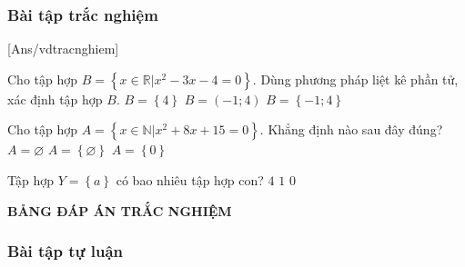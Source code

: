 \documentclass[Main.tex]{subfiles}
\begin{document}
	\baitap
	\subsubsection{Bài tập trắc nghiệm}
	[Ans/vdtracnghiem]
	\begin{ex}%
		Cho tập hợp $B = \left\{x \in \mathbb{R}\big| x^2 - 3x - 4 = 0\right\}$. Dùng phương pháp liệt kê phần tử, xác định tập hợp $B$.
		{$B = \left\{4\right\}$}
		{$B = \left(-1;4\right)$}
		{\True $B = \left\{-1;4\right\}$}
	\end{ex}
	
	\begin{ex}%
		Cho tập hợp $A = \left\{x \in \mathbb{N}\big| x^2 + 8x + 15 = 0\right\}$. Khẳng định nào sau đây đúng?
		{\True $A =\varnothing$}
		{$A = \left\{\varnothing\right\}$}
		{$A = \left\{0\right\}$}
	\end{ex}
	
	\begin{ex}%
		Tập hợp $Y = \left\{a\right\}$ có bao nhiêu tập hợp con?
		{$4$}
		{$1$}
		{$0$}
	\end{ex}
	
	\begin{center}
		{\sffamily\bfseries\color{\mauchinh} BẢNG ĐÁP ÁN TRẮC NGHIỆM}
	\end{center}
	
	
	\subsubsection{Bài tập tự luận}
	
\end{document}
